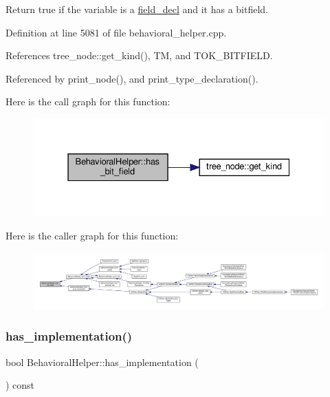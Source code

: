 Return true if the variable is a \hyperlink{structfield__decl}{field\+\_\+decl} and it has a bitfield. 



Definition at line 5081 of file behavioral\+\_\+helper.\+cpp.



References tree\+\_\+node\+::get\+\_\+kind(), TM, and T\+O\+K\+\_\+\+B\+I\+T\+F\+I\+E\+LD.



Referenced by print\+\_\+node(), and print\+\_\+type\+\_\+declaration().

Here is the call graph for this function\+:
\nopagebreak
\begin{figure}[H]
\begin{center}
\leavevmode
\includegraphics[width=331pt]{dd/db2/classBehavioralHelper_a60077771dc29e3fddbbcfe9330b38030_cgraph}
\end{center}
\end{figure}
Here is the caller graph for this function\+:
\nopagebreak
\begin{figure}[H]
\begin{center}
\leavevmode
\includegraphics[width=350pt]{dd/db2/classBehavioralHelper_a60077771dc29e3fddbbcfe9330b38030_icgraph}
\end{center}
\end{figure}
\mbox{\label{classBehavioralHelper_a4b693bb37cb6ebe5af1d0e8b41ee847a}} 
\subsubsection{\texorpdfstring{has\+\_\+implementation()}{has\_implementation()}}
{\footnotesize\ttfamily bool Behavioral\+Helper\+::has\+\_\+implementation (\begin{DoxyParamCaption}{ }\end{DoxyParamCaption}) const}



